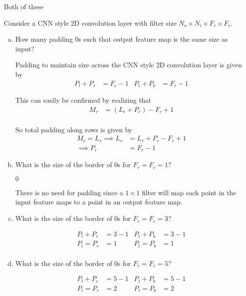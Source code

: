 \documentclass[11pt]{article}
\begin{document}
Both of these

Consider a CNN style 2D convolution layer with filter size $N_o \times N_i
\times F_r \times F_c$.
\begin{enumerate}[(a)]\itemsep0pt
	\item How many padding $0$s such that output feature map is the same size
		as input?
		\begin{solution}

			Padding to maintain size across the CNN style 2D convolution layer
			is given by
			\begin{align}
				P_l+P_r&=F_c-1 & P_t+P_b&=F_r-1
			\end{align}

			This can easily be confirmed by realizing that
			\begin{align}
				M_r &= (L_r+P_r) - F_r + 1 \\
			\end{align}

			So total padding along rows is given by
			\begin{align}
				M_r = L_r \implies L_r &= L_r + P_r - F_r + 1 \\
				\implies P_r &= F_r - 1
			\end{align}
		\end{solution}
	\item What is the size of the border of $0$s for $F_r=F_c=1$?
		\begin{solution}
			$0$

			There is no need for padding since a $1\times1$ filter will map
			each point in the input feature maps to a point in an output
			feature map.
		\end{solution}
	\item What is the size of the border of $0$s for $F_r=F_c=3$?
		\begin{solution}
			\begin{align}
				P_l+P_r&=3-1 & P_t+P_b&=3-1 \\
				P_l=P_r&=1 & P_t=P_b&=1 \\
			\end{align}
		\end{solution}
	\item What is the size of the border of $0$s for $F_r=F_c=5$?
		\begin{solution}
			\begin{align}
				P_l+P_r&=5-1 & P_t+P_b&=5-1 \\
				P_l=P_r&=2 & P_t=P_b&=2 \\
			\end{align}
		\end{solution}
\end{enumerate}
\end{document}
